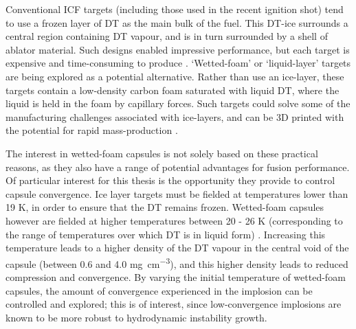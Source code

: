 Conventional ICF targets (including those used in the recent ignition shot) tend to use a frozen layer of DT as the main bulk of the fuel. This DT-ice surrounds a central region containing DT vapour, and is in turn surrounded by a shell of ablator material. Such designs enabled impressive performance, but each target is expensive and time-consuming to produce \cite{Goncharov2020}. `Wetted-foam' or `liquid-layer' targets are being explored as a potential alternative. Rather than use an ice-layer, these targets contain a low-density carbon foam saturated with liquid DT, where the liquid is held in the foam by capillary forces. Such targets could solve some of the manufacturing challenges associated with ice-layers, and can be 3D printed with the potential for rapid mass-production \cite{Olson2021}.

The interest in wetted-foam capsules is not solely based on these practical reasons, as they also have a range of potential advantages for fusion performance. Of particular interest for this thesis is the opportunity they provide to control capsule convergence. Ice layer targets must be fielded at temperatures lower than 19 K, in order to ensure that the DT remains frozen. Wetted-foam capsules however are fielded at higher temperatures between 20 - 26 K (corresponding to the range of temperatures over which DT is in liquid form) \cite{Olson2016}. Increasing this temperature leads to a higher density of the DT vapour in the central void of the capsule (between 0.6 and 4.0 \unit{\milli\gram\per\centi\meter\cubed}), and this higher density leads to reduced compression and convergence. By varying the initial temperature of wetted-foam capsules, the amount of convergence experienced in the implosion can be controlled and explored; this is of interest, since low-convergence implosions are known to be more robust to hydrodynamic instability growth.


